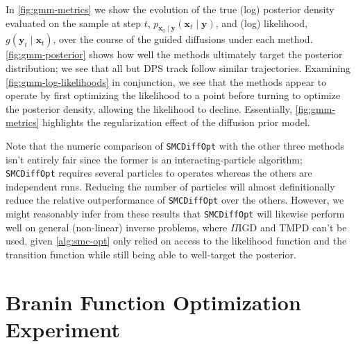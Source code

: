 In \autoref{fig:gmm-metrics} we show the evolution of the true (log) posterior density evaluated on the
sample at step $t$, $p_{\mathbf{x}_0 \mid \mathbf{y}}(\mathbf{x}_t \mid \mathbf{y})$, and (log)
likelihood, $g(\mathbf{y}_t \mid \mathbf{x}_t)$, over the course of the guided diffusions under
each method. \autoref{fig:gmm-posterior} shows how well the methods ultimately target the posterior
distribution; we see that all but DPS track follow similar trajectories.
Examining \autoref{fig:gmm-log-likelihoods} in conjunction, we see that the methods appear to operate
by first optimizing the likelihood to a point before turning to optimize the posterior density,
allowing the likelihood to decline. Essentially, \autoref{fig:gmm-metrics} highlights the regularization
effect of the diffusion prior model.

Note that the numeric comparison of \texttt{SMCDiffOpt} with the other three methods isn't entirely
fair since the former is an interacting-particle algorithm; \texttt{SMCDiffOpt} requires several
particles to operates whereas the others are independent runs. Reducing the number of particles
will almost definitionally reduce the relative outperformance of \texttt{SMCDiffOpt} over the
others. However, we might reasonably infer from these results that \texttt{SMCDiffOpt} will
likewise perform well on general (non-linear) inverse problems, where $\Pi$IGD and TMPD can't be
used, given \autoref{alg:smc-opt} only relied on access to the likelihood function and the
transition function while still being able to well-target the posterior.

\section{Branin Function Optimization Experiment} \label{sec:branin}

